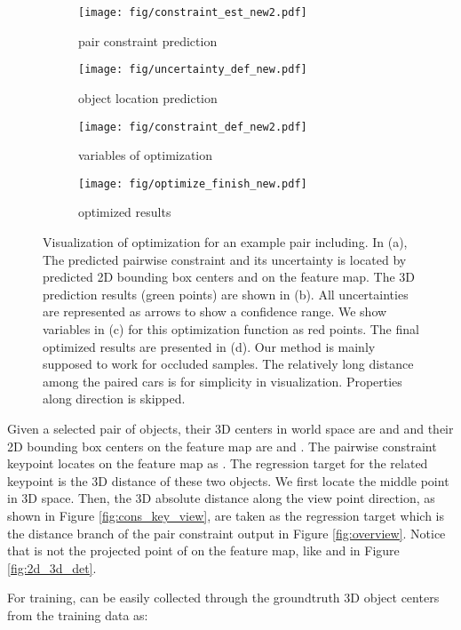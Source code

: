 \documentclass[10pt,twocolumn,letterpaper]{article}
\begin{document}
\begin{figure*}[!ht]
  \centering
  \begin{subfigure}{0.23\linewidth}
		\texttt{[image: fig/constraint\_est\_new2.pdf]}
		\caption{pair constraint prediction}
		\label{fig:optim_pair}
	\end{subfigure}
  \begin{subfigure}{0.27\linewidth}
		\texttt{[image: fig/uncertainty\_def\_new.pdf]}
		\caption{object location prediction}
		\label{fig:optim_single}
	\end{subfigure}
  \begin{subfigure}{0.23\linewidth}
		\texttt{[image: fig/constraint\_def\_new2.pdf]}
		\caption{variables of optimization}
		\label{fig:optim_target}
	\end{subfigure}
\begin{subfigure}{0.23\linewidth}
		\texttt{[image: fig/optimize\_finish\_new.pdf]}
		\caption{optimized results}
	\end{subfigure}
	\caption{
  Visualization of optimization for an example pair including. In (a), The predicted pairwise constraint  and its uncertainty  is located by predicted 2D bounding box centers  and  on the feature map.
  The 3D prediction results (green points) are shown in (b). All uncertainties are represented as arrows to show a confidence range.
  We show variables in (c) for this optimization function as red points. The final optimized results are presented in (d). Our method is mainly supposed to work for occluded samples. The relatively long distance among the paired cars is for simplicity in visualization. Properties along  direction is skipped.
  }
     \label{fig:optimization}
 \end{figure*}


Given a selected pair of objects, their 3D centers in world space are
 and 
and their 2D bounding box centers on the feature map are
 and  .
The pairwise constraint keypoint locates on the feature map as .
The regression target for the related keypoint is the 3D distance of these two objects.
We first locate the middle point  in 3D space. Then, the 3D absolute distance  along the view point direction, as shown in Figure \ref{fig:cons_key_view}, are taken as the regression target which is the distance branch of the pair constraint output in Figure \ref{fig:overview}.
Notice that  is not the projected point of  on the feature map, like  and  in Figure \ref{fig:2d_3d_det}.

For training,  can be easily collected through the groundtruth 3D object centers from the training data as:
\end{document}
